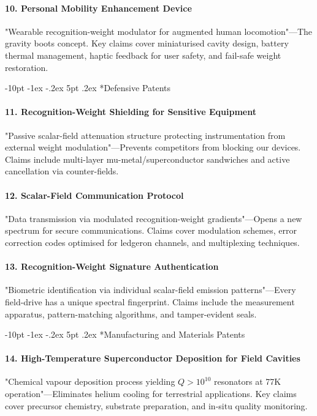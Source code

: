 \documentclass[12pt,letterpaper]{book}
\makeatletter
\renewcommand\section{\@startsection {section}{1}{\z@}%
                {-10pt \@plus -1ex \@minus -.2ex}%
                {5pt \@plus.2ex}%
                {\normalfont\large\bfseries}}
\makeatother
\begin{document}
\paragraph{10. Personal Mobility Enhancement Device}
"Wearable recognition-weight modulator for augmented human locomotion"—The gravity boots concept.  Key claims cover miniaturised cavity design, battery thermal management, haptic feedback for user safety, and fail-safe weight restoration.

\section*{Defensive Patents}

\paragraph{11. Recognition-Weight Shielding for Sensitive Equipment}
"Passive scalar-field attenuation structure protecting instrumentation from external weight modulation"—Prevents competitors from blocking our devices.  Claims include multi-layer mu-metal/superconductor sandwiches and active cancellation via counter-fields.

\paragraph{12. Scalar-Field Communication Protocol}
"Data transmission via modulated recognition-weight gradients"—Opens a new spectrum for secure communications.  Claims cover modulation schemes, error correction codes optimised for ledgeron channels, and multiplexing techniques.

\paragraph{13. Recognition-Weight Signature Authentication}
"Biometric identification via individual scalar-field emission patterns"—Every field-drive has a unique spectral fingerprint.  Claims include the measurement apparatus, pattern-matching algorithms, and tamper-evident seals.

\section*{Manufacturing and Materials Patents}

\paragraph{14. High-Temperature Superconductor Deposition for Field Cavities}
"Chemical vapour deposition process yielding $Q>10^{10}$ resonators at 77K operation"—Eliminates helium cooling for terrestrial applications.  Key claims cover precursor chemistry, substrate preparation, and in-situ quality monitoring.
\end{document}
